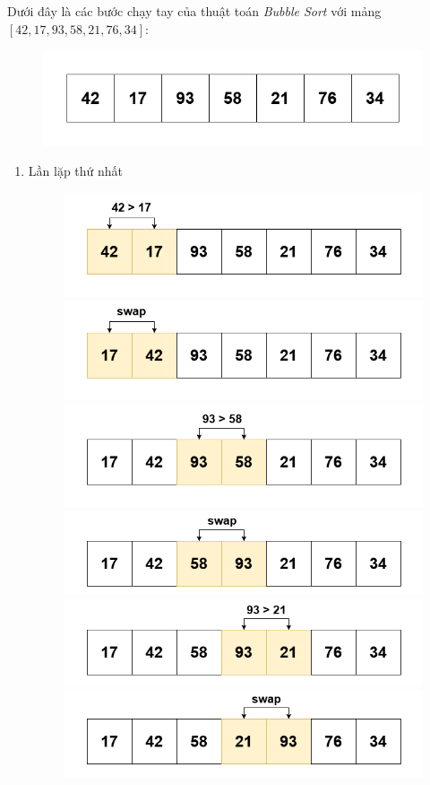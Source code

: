 Dưới đây là các bước chạy tay của thuật toán \textit{Bubble Sort} với mảng $[42, 17, 93, 58, 21, 76, 34]$:
\begin{figure}[H]
    \centering
    \includegraphics[width=0.75\linewidth]{img/bubble_sort/1.png}
\end{figure}
\newpage
\begin{enumerate}
    \item Lần lặp thứ nhất
    \begin{figure}[H]
        \centering
        \includegraphics[width=0.75\linewidth]{img/bubble_sort/2.png}
        \includegraphics[width=0.75\linewidth]{img/bubble_sort/3.png}
        \includegraphics[width=0.75\linewidth]{img/bubble_sort/4.png}
        \includegraphics[width=0.75\linewidth]{img/bubble_sort/5.png}
        \includegraphics[width=0.75\linewidth]{img/bubble_sort/6.png}
        \includegraphics[width=0.75\linewidth]{img/bubble_sort/7.png}
    \end{figure}


\end{enumerate}
